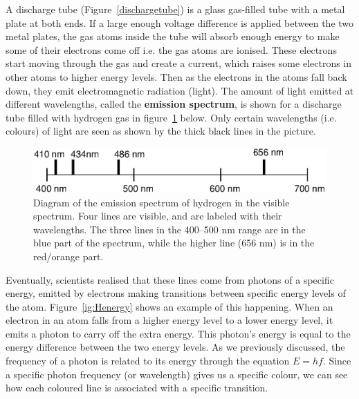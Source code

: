 A discharge tube (Figure~\ref{dischargetube}) is a glass gas-filled tube with a metal plate at both ends. If a large enough voltage difference is applied between the two metal plates, the gas atoms inside the tube will absorb enough energy to make some of their electrons come off i.e. the gas atoms are ionised. These electrons start moving through the gas and create a current, which raises some electrons in other atoms to higher energy levels. Then as the electrons in the atoms fall back down, they emit electromagnetic radiation (light). The amount of light emitted at different wavelengths, called the \textbf{emission spectrum}, is shown for a discharge tube filled with hydrogen gas in figure~\ref{hydrogenspectrum} below. Only certain wavelengths (i.e. colours) of light are seen as shown by the thick black lines in the picture.

\begin{figure}[H]
\begin{center}
\includegraphics[width=4.5in]{../../epsimages/hydrogen_emission_spectrum.eps}
\end{center}
\caption{Diagram of the emission spectrum of hydrogen in the visible spectrum.  Four lines are visible, and are labeled with their wavelengths.  The three lines in the 400--500 nm range are in the blue part of the spectrum, while the higher line (656 nm) is in the red/orange part.}
\label{hydrogenspectrum}
\end{figure}

Eventually, scientists realised that these lines come from photons of a specific energy, emitted by electrons making transitions between specific energy levels of the atom.  Figure~\ref{ig:Henergy} shows an example of this happening.  When an electron in an atom falls from a higher energy level to a lower energy level, it emits a photon to carry off the extra energy.  This photon's energy is equal to the energy difference between the two energy levels.  As we previously discussed, the frequency of a photon is related to its energy through the equation $E=hf$.  Since a specific photon frequency (or wavelength) gives us a specific colour, we can see how each coloured line is associated with a specific transition. 
 


